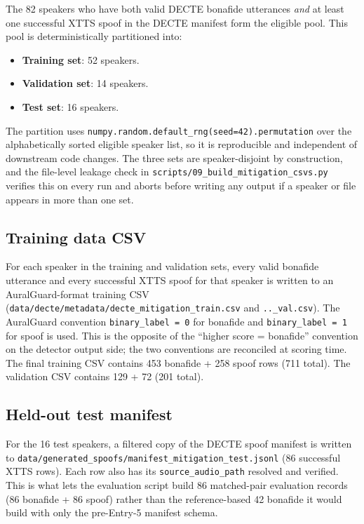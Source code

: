 The 82 speakers who have both valid DECTE bonafide utterances
\emph{and} at least one successful XTTS spoof in the DECTE manifest
form the eligible pool. This pool is deterministically partitioned
into:

\begin{itemize}
    \item \textbf{Training set}: 52 speakers.
    \item \textbf{Validation set}: 14 speakers.
    \item \textbf{Test set}: 16 speakers.
\end{itemize}

The partition uses \texttt{numpy.random.default\_rng(seed=42).permutation}
over the alphabetically sorted eligible speaker list, so it is
reproducible and independent of downstream code changes. The three
sets are speaker-disjoint by construction, and the file-level
leakage check in \texttt{scripts/09\_build\_mitigation\_csvs.py}
verifies this on every run and aborts before writing any output if
a speaker or file appears in more than one set.

\subsection{Training data CSV}
\label{sec:methodology-mitigation-csv}

For each speaker in the training and validation sets, every valid
bonafide utterance and every successful XTTS spoof for that speaker
is written to an AuralGuard-format training CSV
(\texttt{data/decte/metadata/}\allowbreak\texttt{decte\_mitigation\_train.csv}
and \texttt{..\_val.csv}). The AuralGuard convention
\texttt{binary\_label = 0} for bonafide and \texttt{binary\_label = 1}
for spoof is used. This is the opposite of the ``higher score =
bonafide'' convention on the detector output side; the two
conventions are reconciled at scoring time. The final training CSV
contains 453 bonafide + 258 spoof rows (711 total). The validation
CSV contains 129 + 72 (201 total).

\subsection{Held-out test manifest}
\label{sec:methodology-mitigation-testmanifest}

For the 16 test speakers, a filtered copy of the DECTE spoof
manifest is written to
\texttt{data/generated\_spoofs/manifest\_mitigation\_test.jsonl} (86
successful XTTS rows). Each row also has its
\texttt{source\_audio\_path} resolved and verified. This is what
lets the evaluation script build 86 matched-pair evaluation records
(86 bonafide + 86 spoof) rather than the reference-based 42
bonafide it would build with only the pre-Entry-5 manifest schema.

